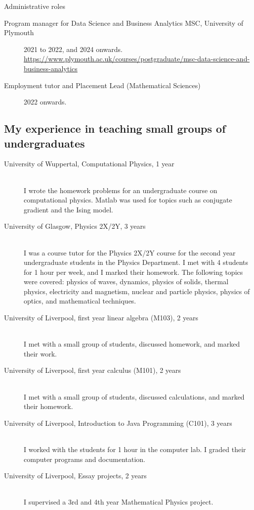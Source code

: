 \documentclass[12pt]{article}
\begin{document}
Administrative roles

\begin{description}

\item[Program manager for Data Science and Business Analytics MSC,
  University of Plymouth] 2021 to 2022, and 2024 onwards. \url{https://www.plymouth.ac.uk/courses/postgraduate/msc-data-science-and-business-analytics}

\item[Employment tutor and Placement Lead (Mathematical Sciences)]
  2022 onwards.
  
\end{description}



\subsection{My experience in teaching small groups of undergraduates}


\begin{description}
  \item[University of Wuppertal, Computational Physics, 1 year] \hfill \\
I wrote
the homework problems for an 
undergraduate course on computational
physics. Matlab was used for topics such as conjugate gradient
and the Ising model.

  \item[University of Glasgow, Physics 2X/2Y, 3 years] \hfill \\
I was a course tutor for the Physics 2X/2Y course
for the second year undergraduate students
in the Physics Department. I met with 4 students for 1 hour per week,
and I marked their homework.
The following topics were covered:
physics of waves, dynamics, physics of solids, thermal physics,
electricity and magnetism, nuclear and particle physics, physics of
optics, and mathematical techniques.

\item[University of Liverpool, first year linear algebra
 (M103), 2 years] \hfill \\
I met with a small group of students, discussed homework,
and marked their work.

\item[University of Liverpool, first year calculus (M101), 2 years] \hfill \\
I met with a small group of students, discussed calculations,
and marked their homework.



\item[University of Liverpool, Introduction to Java Programming
 (C101), 3 years] \hfill \\
I worked with the students for 1 hour in the computer lab.
I graded their computer programs and documentation.



\item[University of Liverpool, Essay projects, 2 years] \hfill \\
I supervised a 3rd and 4th year Mathematical Physics project.

\end{description}
\end{document}
